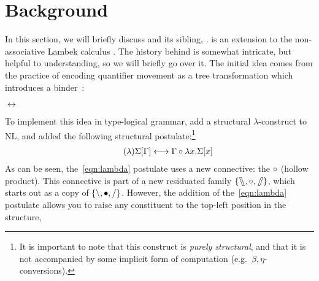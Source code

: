 \documentclass[10pt,a4paper]{llncs}
\begin{document}
\section{Background}
In this section, we will briefly discuss {\NLCL} and its sibling,
{\NLLAM}. {\NLCL} is an extension to the non-associative Lambek
calculus \citep[NL;][]{lambek1961}.
The history behind {\NLCL} is somewhat intricate, but helpful to
understanding, so we will briefly go over it.
The initial idea comes from the practice of encoding quantifier
movement as a tree transformation which introduces a
binder~\citep{heim1998}:
\begin{center}
  \begin{minipage}{0.4\linewidth}\centering
  \end{minipage}%
  \begin{minipage}{0.05\linewidth}\centering
    $\longleftrightarrow$
  \end{minipage}%
  \begin{minipage}{0.5\linewidth}\centering
  \end{minipage}
\end{center}
To implement this idea in type-logical grammar,
\citeauthor{barker2015} add a structural $\lambda$-construct to NL,
and added the following structural postulate:\footnote{%
  It is important to note that this construct is \emph{purely
  structural}, and that it is not accompanied by some implicit form of
  computation (e.g.\ $\beta,\eta$-conversions).
}
\begin{align}
  \tag{$\lambda$}
  \Sigma[\Gamma] \longleftrightarrow \Gamma\mathbin{\circ}\lambda{x}.\Sigma[x]
  \label{eqn:lambda}
\end{align}
As can be seen, the~\eqref{eqn:lambda} postulate uses a new
connective: the $\mathbin{\circ}$ (hollow product).
This connective is part of a new residuated family $\{\fatbslash, \mathbin{\circ},
\mathbin{\!\fatslash\,}\}$, which starts out as a copy of $\{\mathbin{\backslash}, \bullet,
\mathbin{\slash}\}$.
However, the addition of the~\eqref{eqn:lambda} postulate allows you
to raise any constituent to the top-left position in the structure,
\end{document}
